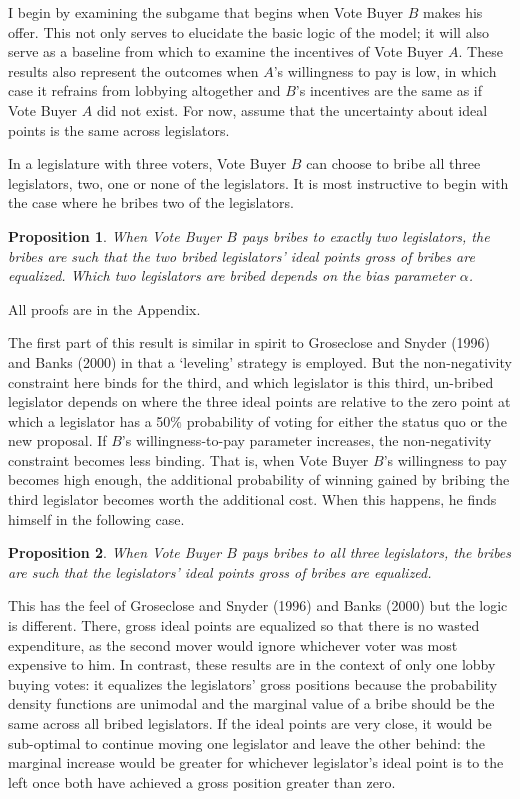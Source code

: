 \documentclass[12pt]{article}
\newtheorem{proposition}{Proposition}
\newcommand{\al}{\alpha}
\begin{document}
I begin by examining the subgame that begins when Vote Buyer $B$ makes his offer. This not only serves to elucidate the basic logic of the model; it will also serve as a baseline from which to examine the incentives of Vote Buyer $A$. These results also represent the outcomes when $A$'s willingness to pay is low, in which case it refrains from lobbying altogether and $B$'s incentives are the same as if Vote Buyer $A$ did not exist. For now, assume that the uncertainty about ideal points is the same across legislators.

In a legislature with three voters, Vote Buyer $B$ can choose to bribe all three legislators, two, one or none of the legislators. It is most instructive to begin with the case where he bribes two of the legislators.

\begin{proposition}
  When Vote Buyer $B$ pays bribes to exactly two legislators, the bribes are such that the two bribed legislators' ideal points gross of bribes are equalized. Which two legislators are bribed depends on the bias parameter $\al$.
	\label{prop:2NNB}
\end{proposition}

All proofs are in the Appendix.

The first part of this result is similar in spirit to Groseclose and Snyder (1996) and Banks (2000) in that a `leveling' strategy is employed. But the non-negativity constraint here binds for the third, and which legislator is this third, un-bribed legislator depends on where the three ideal points are relative to the zero point at which a legislator has a 50$\%$ probability of voting for either the status quo or the new proposal. If $B$'s willingness-to-pay parameter increases, the non-negativity constraint becomes less binding. That is, when Vote Buyer $B$'s willingness to pay becomes high enough, the additional probability of winning gained by bribing the third legislator becomes worth the additional cost. When this happens, he finds himself in the following case.

\begin{proposition}
  When Vote Buyer $B$ pays bribes to all three legislators, the bribes are such that the legislators' ideal points gross of bribes are equalized.
	\label{prop:3NNB}
\end{proposition}

This has the feel of Groseclose and Snyder (1996) and Banks (2000) but the logic is different. There, gross ideal points are equalized so that there is no wasted expenditure, as the second mover would ignore whichever voter was most expensive to him. In contrast, these results are in the context of only one lobby buying votes: it equalizes the legislators' gross positions because the probability density functions are unimodal and the marginal value of a bribe should be the same across all bribed legislators. If the ideal points are very close, it would be sub-optimal to continue moving one legislator and leave the other behind: the marginal increase would be greater for whichever legislator's ideal point is to the left once both have achieved a gross position greater than zero.
\end{document}
